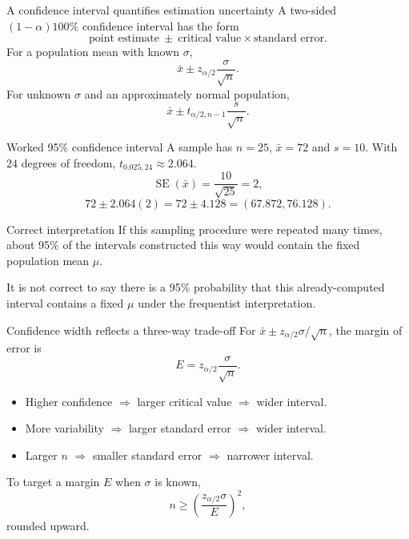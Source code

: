 \documentclass[aspectratio=169,11pt]{beamer}
\begin{document}
\begin{frame}{A confidence interval quantifies estimation uncertainty}
A two-sided $(1-\alpha)100\%$ confidence interval has the form
\[
\boxed{\text{point estimate}\ \pm\ \text{critical value}\times\text{standard error}}.
\]
For a population mean with known $\sigma$,
\[
\bar{x}\pm z_{\alpha/2}\frac{\sigma}{\sqrt n}.
\]
For unknown $\sigma$ and an approximately normal population,
\[
\bar{x}\pm t_{\alpha/2,n-1}\frac{s}{\sqrt n}.
\]
\end{frame}

\begin{frame}{Worked 95\% confidence interval}
A sample has $n=25$, $\bar{x}=72$ and $s=10$. With $24$ degrees of freedom, $t_{0.025,24}\approx2.064$.
\[
\operatorname{SE}(\bar{x})=\frac{10}{\sqrt{25}}=2,
\]
\[
72\pm2.064(2)=72\pm4.128=(67.872,76.128).
\]
\begin{block}{Correct interpretation}
If this sampling procedure were repeated many times, about 95\% of the intervals constructed this way would contain the fixed population mean $\mu$.
\end{block}
It is not correct to say there is a 95\% probability that this already-computed interval contains a fixed $\mu$ under the frequentist interpretation.
\end{frame}

\begin{frame}{Confidence width reflects a three-way trade-off}
For $\bar{x}\pm z_{\alpha/2}\sigma/\sqrt n$, the margin of error is
\[
E=z_{\alpha/2}\frac{\sigma}{\sqrt n}.
\]
\begin{itemize}
  \item Higher confidence $\Rightarrow$ larger critical value $\Rightarrow$ wider interval.
  \item More variability $\Rightarrow$ larger standard error $\Rightarrow$ wider interval.
  \item Larger $n$ $\Rightarrow$ smaller standard error $\Rightarrow$ narrower interval.
\end{itemize}
To target a margin $E$ when $\sigma$ is known,
\[
n\ge\left(\frac{z_{\alpha/2}\sigma}{E}\right)^2,
\]
rounded upward.
\end{frame}
\end{document}
